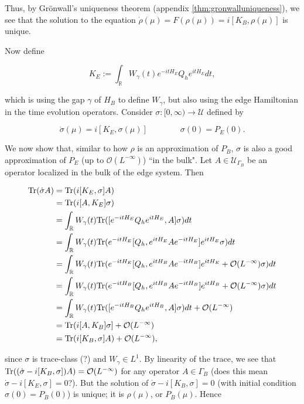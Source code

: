 \documentclass[12pt, letterpaper]{article}
\begin{document}
Thus, by Gr\"{o}nwall's uniqueness theorem (appendix \ref{thm:gronwalluniqueness}), we see that the solution to the equation $\dot{\rho}(\mu) = F(\rho(\mu)) = i[K_B,\rho(\mu)]$ is unique. 

Now define 

\[K_E := \int_\mathbb{R} W_\gamma(t) e^{-itH_E}Q_he^{itH_E}dt,\]

which is using the gap $\gamma$ of $H_B$ to define $W_\gamma$, but also using the edge Hamiltonian in the time evolution operators. Consider $\sigma:[0,\infty)\to\mathcal{U}$ defined by

\[\dot{\sigma}(\mu) = i[K_E, \sigma(\mu)] \quad\quad\quad\quad \sigma(0) = P_E(0).\]

We now show that, similar to how $\rho$ is an approximation of $P_B$, $\sigma$ is also a good approximation of $P_E$ (up to $\mathcal{O}(L^{-\infty})$) ``in the bulk". Let $A\in \mathcal{U}_{\Gamma_B}$ be an operator localized in the bulk of the edge system. Then 

\[\begin{aligned}
\text{Tr}(\dot{\sigma} A) &= \text{Tr} (i[K_E, \sigma]A)\\
&= \text{Tr}(i[A,K_E]\sigma)\\
&= \int_\mathbb{R}W_\gamma(t) \text{Tr}([e^{-itH_E}Q_he^{itH_E}, A] \sigma)dt\\
&= \int_\mathbb{R}W_\gamma(t) \text{Tr}(e^{-itH_E}[Q_h, e^{itH_E}Ae^{-itH_E}]e^{itH_E} \sigma)dt\\
&= \int_\mathbb{R}W_\gamma(t) \text{Tr}(e^{-itH_E}[Q_h, e^{itH_B}Ae^{-itH_B}]e^{itH_E} + \mathcal{O}(L^{-\infty})\sigma)dt\\
&= \int_\mathbb{R}W_\gamma(t) \text{Tr}(e^{-itH_B}[Q_h, e^{itH_B}Ae^{-itH_B}]e^{itH_B} + \mathcal{O}(L^{-\infty})\sigma)dt\\
&= \int_\mathbb{R}W_\gamma(t) \text{Tr}([e^{-itH_B}Q_he^{itH_B}, A] \sigma)dt + \mathcal{O}(L^{-\infty})\\
&= \text{Tr}(i[A,K_B]\sigma] + \mathcal{O}(L^{-\infty})\\
&= \text{Tr}(i[K_B,\sigma]A) + \mathcal{O}(L^{-\infty}),
\end{aligned}\]

since $\sigma$ is trace-class (?) and $W_\gamma \in L^1$. By linearity of the trace, we see that $\text{Tr}((\dot{\sigma} - i[K_B,\sigma])A) = \mathcal{O}(L^{-\infty})$ for any operator $A \in \Gamma_B$ (does this mean $\dot{\sigma}-i[K_E,\sigma] = 0$?). But the solution of $\dot{\sigma} - i[K_B,\sigma] = 0$ (with initial condition $\sigma(0)=P_B(0)$) is unique; it is $\rho(\mu)$, or $P_B(\mu)$. Hence
\end{document}
